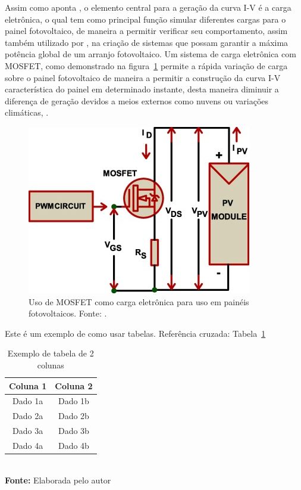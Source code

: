 Assim como aponta , o elemento central para a geração da curva I-V é a carga eletrônica, o qual tem como principal função simular diferentes cargas para o painel fotovoltaico, de maneira a permitir verificar seu comportamento, assim também utilizado por , na criação de sistemas que possam garantir a máxima potência global de um arranjo fotovoltaico. Um sistema de carga eletrônica com MOSFET, como demonstrado na figura~\ref{fig:CargaELE} permite a rápida variação de carga sobre o painel fotovoltaico de maneira a permitir a construção da curva I-V característica do painel em determinado instante, desta maneira diminuir a diferença de geração devidos a meios externos como nuvens ou variações climáticas, \cite{WILLOUGHBY2018171}.%

\FloatBarrier
\begin{figure}[!htbp]
	\centering
	\includegraphics[scale=1]{imagens/MOSFET_LOAD}
	\caption{Uso de MOSFET como carga eletrônica para uso em painéis fotovoltaicos. Fonte: . }
	
	\label{fig:CargaELE}
\end{figure}
\FloatBarrier





Este é um exemplo de como usar tabelas. Referência cruzada: Tabela~\ref{tab:exemplo}

\FloatBarrier
\begin{table}[!htbp]
\centering
\caption{Exemplo de tabela de 2 colunas}
	\begin{tabular}{ c | c }
		\hline
		\textbf{Coluna 1} & \textbf{Coluna 2} \\ \hline
		Dado 1a           & Dado 1b           \\ \hline
		Dado 2a           & Dado 2b           \\ \hline
		Dado 3a           & Dado 3b           \\ \hline
		Dado 4a           & Dado 4b           \\ \hline
	\end{tabular}
	\\ \vspace{0.2cm}
	\textbf{Fonte:} Elaborada pelo autor
	\label{tab:exemplo}
\end{table}
\FloatBarrier


